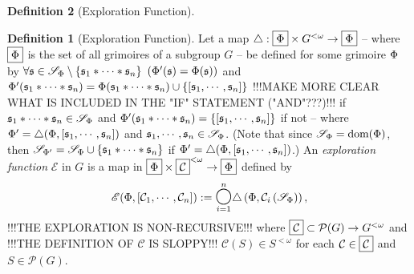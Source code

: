 \documentclass[a4paper,twoside,12pt,openany]{report}
\theoremstyle{plain}
\theoremstyle{definition}
\newtheorem{definition}{Definition}
\theoremstyle{remark}
\begin{document}
\begin{definition}[Exploration Function]
\begin{definition}[Exploration Function]
	Let a map \(\triangle:\grimset \times G^{<\omega} \to \grimset\) -- where \(\grimset\) is the set of all grimoires of a subgroup \(G\) -- be defined for some grimoire \(\Phi\) by \(\forall \mathfrak{s}\in \mathscr{S}_{\Phi} \setminus\left\{ \mathfrak{s}_1*\cdots*\mathfrak{s}_n \right\}\ \left(\Phi'(\mathfrak{s}) = \Phi(\mathfrak{s})\right)\) and \(\Phi'(\mathfrak{s}_1*\cdots*\mathfrak{s}_n) = \Phi(\mathfrak{s}_1*\cdots*\mathfrak{s}_n)\cup\left\{ \left[ \mathfrak{s}_1,\cdots,\mathfrak{s}_n \right] \right\}\) \color{red}!!!MAKE MORE CLEAR WHAT IS INCLUDED IN THE "IF" STATEMENT ("AND"???)!!!\color{black} if \(\mathfrak{s}_1*\cdots*\mathfrak{s}_n\in \mathscr{S}_{\Phi}\) and \(\Phi'(\mathfrak{s}_1*\cdots*\mathfrak{s}_n) = \left\{ \left[ \mathfrak{s}_1,\cdots,\mathfrak{s}_n \right] \right\}\) if not -- where \(\Phi' = \triangle(\Phi, \left[ \mathfrak{s}_1,\cdots,\mathfrak{s}_n \right])\) and \(\mathfrak{s}_1,\cdots, \mathfrak{s}_n \in \mathscr{S}_{\Phi}\). (Note that since \(\mathscr{S}_{\Phi}=\text{dom}(\Phi)\), then \(\mathscr{S}_{\Phi'}=\mathscr{S}_{\Phi}\cup\left\{ \mathfrak{s}_1*\cdots*\mathfrak{s}_n \right\}\) if \(\Phi' = \triangle(\Phi, \left[ \mathfrak{s}_1,\cdots,\mathfrak{s}_n \right])\).)
	An \emph{exploration function} \(\mathscr{E}\) in \(G\) is a map in \(\grimset \times \Cset^{<\omega} \to \grimset\) defined by 
	\[
		\mathscr{E}(\grim, \vect{\mathcal{C}_1,\cdots,\mathcal{C}_n}) := \underset{i=1}{\overset{n}\bbigcirc}\triangle\prnth{\grim, \mathcal{C}_i\prnth{ \spellset{\grim}} }
	,\] \color{red}!!!THE EXPLORATION IS NON-RECURSIVE!!!\color{black}
	where \(\Cset\subset\mathcal{P}(G)\to G^{<\omega}\) and \color{red}!!!THE DEFINITION OF \(\mathcal{C}\) IS SLOPPY!!!\color{black}
	\(\mathcal{C}(S)\in S^{<\omega}\) for each \(\mathcal{C}\in\Cset\) and \(S\in\mathcal{P}(G)\).
\end{definition}


\end{definition}
\end{document}
